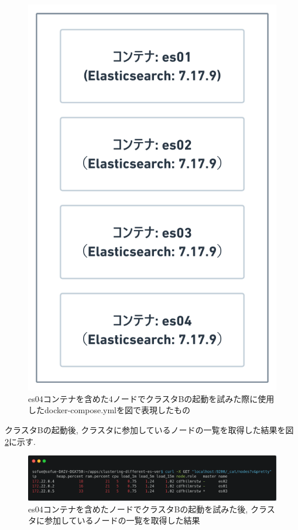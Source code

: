 \begin{figure}[H]
  \begin{center}
    \includegraphics[width=120mm]{sotu/figure/4-7.17.9.png}
    \caption{es04コンテナを含めた4ノードでクラスタBの起動を試みた際に使用したdocker-compose.ymlを図で表現したもの}
    \label{4-p13}
  \end{center}
\end{figure}

クラスタBの起動後, クラスタに参加しているノードの一覧を取得した結果を図 \ref{4-p14}に示す.

\begin{figure}[H]
  \begin{center}
    \includegraphics[width=140mm]{sotu/figure/4nodes-list.png}
    \caption{es04コンテナを含めたノードでクラスタBの起動を試みた後, クラスタに参加しているノードの一覧を取得した結果}
    \label{4-p14}
  \end{center}
\end{figure}

